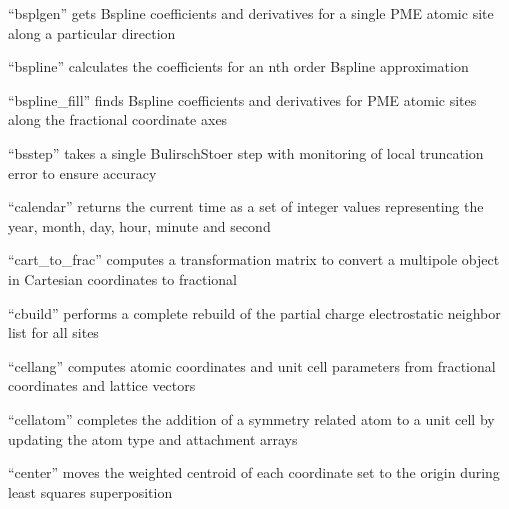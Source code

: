 \documentclass[letterpaper,11pt,english]{sphinxmanual}
\begin{document}
\sphinxAtStartPar
{}

\sphinxAtStartPar
“bsplgen” gets B\sphinxhyphen{}spline coefficients and derivatives for a single PME atomic site along a particular direction

\sphinxAtStartPar
{}

\sphinxAtStartPar
“bspline” calculates the coefficients for an n\sphinxhyphen{}th order B\sphinxhyphen{}spline approximation

\sphinxAtStartPar
{}

\sphinxAtStartPar
“bspline\_fill” finds B\sphinxhyphen{}spline coefficients and derivatives for PME atomic sites along the fractional coordinate axes

\sphinxAtStartPar
{}

\sphinxAtStartPar
“bsstep” takes a single Bulirsch\sphinxhyphen{}Stoer step with monitoring of local truncation error to ensure accuracy

\sphinxAtStartPar
{}

\sphinxAtStartPar
“calendar” returns the current time as a set of integer values representing the year, month, day, hour, minute and second

\sphinxAtStartPar
{}

\sphinxAtStartPar
“cart\_to\_frac” computes a transformation matrix to convert a multipole object in Cartesian coordinates to fractional

\sphinxAtStartPar
{}

\sphinxAtStartPar
“cbuild” performs a complete rebuild of the partial charge electrostatic neighbor list for all sites

\sphinxAtStartPar
{}

\sphinxAtStartPar
“cellang” computes atomic coordinates and unit cell parameters from fractional coordinates and lattice vectors

\sphinxAtStartPar
{}

\sphinxAtStartPar
“cellatom” completes the addition of a symmetry related atom to a unit cell by updating the atom type and attachment arrays

\sphinxAtStartPar
{}

\sphinxAtStartPar
“center” moves the weighted centroid of each coordinate set to the origin during least squares superposition
\end{document}
